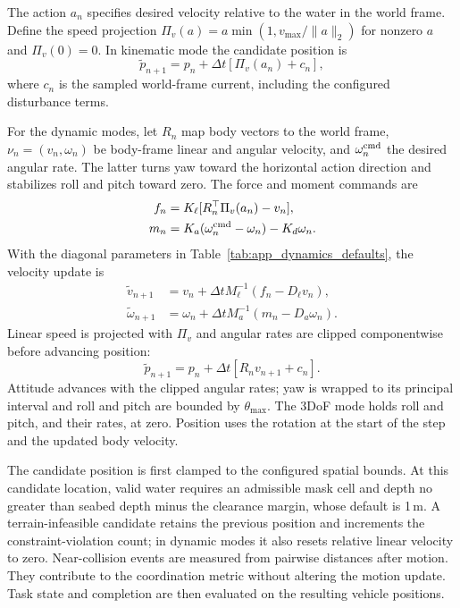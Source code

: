 The action $a_n$ specifies desired velocity relative to the water in the world frame. Define the speed projection $\Pi_v(a)=a\min(1,v_{\max}/\|a\|_2)$ for nonzero $a$ and $\Pi_v(0)=0$. In kinematic mode the candidate position is
\begin{equation}
\widetilde p_{n+1}=p_n+\Delta t[\Pi_v(a_n)+c_n],
\end{equation}
where $c_n$ is the sampled world-frame current, including the configured disturbance terms.

For the dynamic modes, let $R_n$ map body vectors to the world frame, $\nu_n=(v_n,\omega_n)$ be body-frame linear and angular velocity, and $\omega_n^{\rm cmd}$ the desired angular rate. The latter turns yaw toward the horizontal action direction and stabilizes roll and pitch toward zero. The force and moment commands are
\begin{align}
f_n&=K_\ell[R_n^\top\Pi_v(a_n)-v_n],\\
m_n&=K_a(\omega_n^{\rm cmd}-\omega_n)-K_d\omega_n.
\end{align}
With the diagonal parameters in Table~\ref{tab:app_dynamics_defaults}, the velocity update is
\begin{align}
\widetilde v_{n+1}&=v_n+\Delta t M_\ell^{-1}(f_n-D_\ell v_n),\\
\widetilde\omega_{n+1}&=\omega_n+\Delta t M_a^{-1}(m_n-D_a\omega_n).
\end{align}
Linear speed is projected with $\Pi_v$ and angular rates are clipped componentwise before advancing position:
\begin{equation}
\widetilde p_{n+1}=p_n+\Delta t[R_n v_{n+1}+c_n].
\end{equation}
Attitude advances with the clipped angular rates; yaw is wrapped to its principal interval and roll and pitch are bounded by $\theta_{\max}$. The 3DoF mode holds roll and pitch, and their rates, at zero.  Position uses the rotation at the start of the step and the updated body velocity.

The candidate position is first clamped to the configured spatial bounds. At this candidate location, valid water requires an admissible mask cell and depth no greater than seabed depth minus the clearance margin, whose default is 1\,m. A terrain-infeasible candidate retains the previous position and increments the constraint-violation count; in dynamic modes it also resets relative linear velocity to zero. Near-collision events are measured from pairwise distances after motion. They contribute to the coordination metric without altering the motion update. Task state and completion are then evaluated on the resulting vehicle positions.

